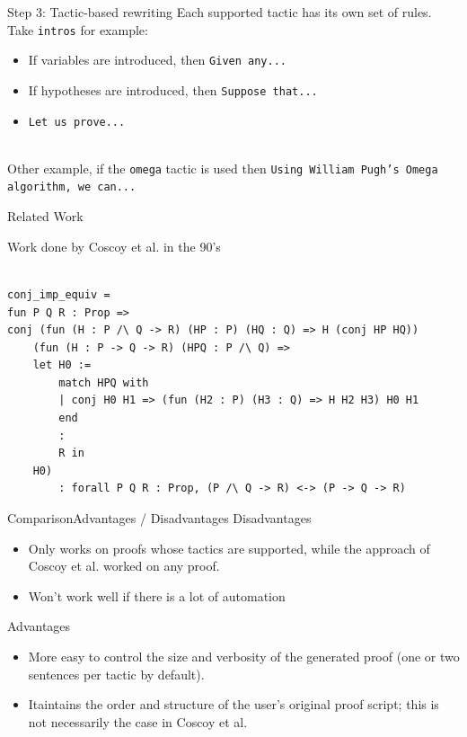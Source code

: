\documentclass[pdf]{beamer}
\begin{document}
\begin{frame}{Step 3: Tactic-based rewriting}
Each supported tactic has its own set of rules. Take {\tt intros} for example:
\begin{itemize}
    \item If variables are introduced, then {\tt Given any...}
    \item If hypotheses are introduced, then {\tt Suppose that...}
    \item {\tt Let us prove...}
\end{itemize}
~\\
Other example, if the {\tt omega} tactic is used then {\tt Using William Pugh's Omega algorithm, we can...}
\end{frame}

\begin{frame}[fragile]{Related Work}

Work done by Coscoy et al. in the 90's\\
~\\
\begin{adjustbox}{minipage=\linewidth,bgcolor=coqatoo-gray,trim=-3pt 5pt -3pt 5pt}            
\begin{lstlisting}
conj_imp_equiv = 
fun P Q R : Prop =>
conj (fun (H : P /\ Q -> R) (HP : P) (HQ : Q) => H (conj HP HQ))
    (fun (H : P -> Q -> R) (HPQ : P /\ Q) =>
    let H0 :=
        match HPQ with
        | conj H0 H1 => (fun (H2 : P) (H3 : Q) => H H2 H3) H0 H1
        end
        :
        R in
    H0)
        : forall P Q R : Prop, (P /\ Q -> R) <-> (P -> Q -> R)
\end{lstlisting}
\end{adjustbox}
\end{frame}


\begin{frame}{Comparison}{Advantages / Disadvantages}
    Disadvantages
    \begin{itemize}
        \item{Only works on proofs whose tactics are supported, while the approach of Coscoy et al. worked on any proof.}
        \item{Won't work well if there is a lot of automation}
    \end{itemize}

    Advantages
    \begin{itemize}
        \item{More easy to control the size and verbosity of the generated proof (one or two sentences per tactic by default).}
        \item{Itaintains the order and structure of the user's original proof script; this is not necessarily the case in Coscoy et al. }
      \end{itemize}
\end{frame}
\end{document}
